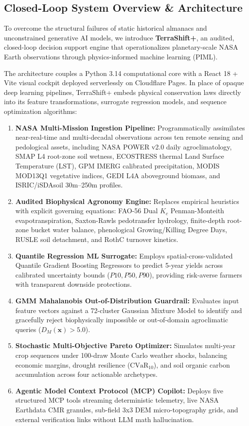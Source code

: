 \documentclass[10pt,twocolumn]{article}
\begin{document}
\subsection{Closed-Loop System Overview \& Architecture}
To overcome the structural failures of static historical almanacs and unconstrained generative AI models, we introduce \textbf{TerraShift+}, an audited, closed-loop decision support engine that operationalizes planetary-scale NASA Earth observations through physics-informed machine learning (PIML).

The architecture couples a Python 3.14 computational core with a React 18 + Vite visual cockpit deployed serverlessly on Cloudflare Pages. In place of opaque deep learning pipelines, TerraShift+ embeds physical conservation laws directly into its feature transformations, surrogate regression models, and sequence optimization algorithms:

\begin{enumerate}[leftmargin=*]
  \item \textbf{NASA Multi-Mission Ingestion Pipeline:} Programmatically assimilates near-real-time and multi-decadal observations across ten remote sensing and pedological assets, including NASA POWER v2.0 daily agroclimatology, SMAP L4 root-zone soil wetness, ECOSTRESS thermal Land Surface Temperature (LST), GPM IMERG calibrated precipitation, MODIS MOD13Q1 vegetative indices, GEDI L4A aboveground biomass, and ISRIC/iSDAsoil 30m--250m profiles.
  \item \textbf{Audited Biophysical Agronomy Engine:} Replaces empirical heuristics with explicit governing equations: FAO-56 Dual $K_c$ Penman-Monteith evapotranspiration, Saxton-Rawls pedotransfer hydrology, finite-depth root-zone bucket water balance, phenological Growing/Killing Degree Days, RUSLE soil detachment, and RothC turnover kinetics.
  \item \textbf{Quantile Regression ML Surrogate:} Employs spatial-cross-validated Quantile Gradient Boosting Regressors to predict 5-year yields across calibrated uncertainty bounds ($P10, P50, P90$), providing risk-averse farmers with transparent downside protections.
  \item \textbf{GMM Mahalanobis Out-of-Distribution Guardrail:} Evaluates input feature vectors against a 72-cluster Gaussian Mixture Model to identify and gracefully reject biophysically impossible or out-of-domain agroclimatic queries ($D_M(\mathbf{x}) > 5.0$).
  \item \textbf{Stochastic Multi-Objective Pareto Optimizer:} Simulates multi-year crop sequences under 100-draw Monte Carlo weather shocks, balancing economic margins, drought resilience ($\text{CVaR}_{10}$), and soil organic carbon accumulation across four actionable archetypes.
  \item \textbf{Agentic Model Context Protocol (MCP) Copilot:} Deploys five structured MCP tools streaming deterministic telemetry, live NASA Earthdata CMR granules, sub-field 3x3 DEM micro-topography grids, and external verification links without LLM math hallucination.
\end{enumerate}
\end{document}

